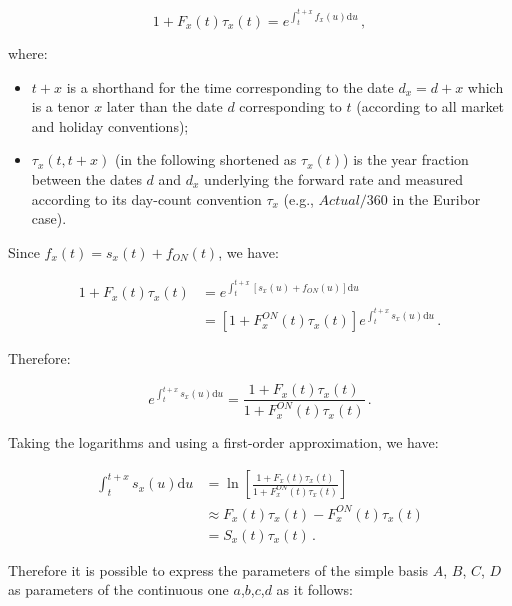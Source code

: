 \begin{equation}
1 + F_x(t) \tau_x(t) = e^{\int_t^{t+x} f_x(u) \mathrm{d}u}\,,
\end{equation} 

where:

\begin{itemize}
    \item $t+x$ is a shorthand for the time corresponding to the date $d_x=d+x$ which is a tenor $x$ later than the date $d$ corresponding to $t$ (according to all market and holiday conventions);
    \item $\tau_x(t, t+x)$ (in the following shortened as $\tau_x(t)$) is the year fraction between the dates $d$ and $d_x$ underlying the forward rate and measured according to its day-count convention $\tau_x$ (e.g., $Actual/360$ in the Euribor case).
\end{itemize}

Since $f_x(t) = s_x(t) + f_{ON}(t)$, we have:

\begin{equation}
\label{eq:forward_from_adj_disc}
\begin{split}
1 + F_x(t) \tau_x(t) &= e^{\int_t^{t+x} [s_x(u) + f_{ON}(u)] \mathrm{d}u}\\
&= [1 + F_x^{ON}(t) \tau_x(t)]e^{\int_t^{t+x} s_x(u) \mathrm{d}u}\,.
\end{split}
\end{equation}

Therefore:

\begin{equation}
e^{\int_t^{t+x} s_x(u) \mathrm{d}u} = \frac{1+ F_x(t) \tau_x(t)}{1+ F_x^{ON}(t) \tau_x(t)}\,. 
\end{equation}

Taking the logarithms and using a first-order approximation, we have:

\begin{equation}
\label{simple-vs-continuous}
\begin{split}
\int_t^{t+x} s_x(u) \mathrm{d}u &= \ln{\left[\frac{1+ F_x(t) \tau_x(t)}{1+ F_x^{ON}(t) \tau_x(t)}\right]}\\ 
&\approx F_x(t) \tau_x(t) - F_x^{ON}(t)\tau_x(t)\\
&= S_x(t) \tau_x(t)\,.
\end{split}
\end{equation}

Therefore it is possible to express the parameters of the simple basis $A$, $B$, $C$, $D$ as parameters of the continuous one $a$,$b$,$c$,$d$ as it follows:


